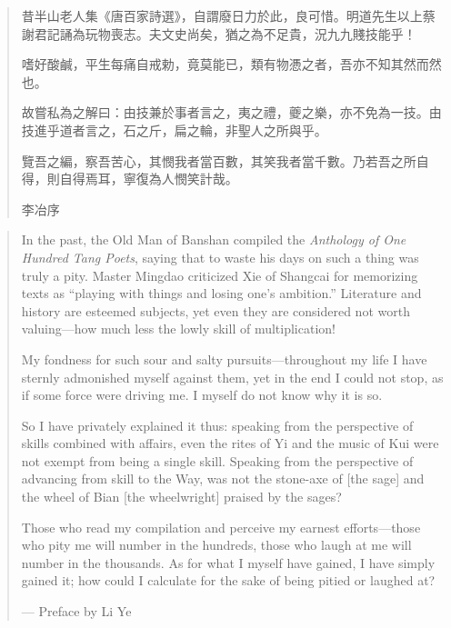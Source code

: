 \documentclass[11pt,a4paper]{article}
\newlength{\chwidth}
\newlength{\enwidth}
\newcommand{\zh}[1]{{\CJKfamily{sf}#1}}
\newenvironment{bilingual}{%
  \noindent
  \begin{minipage}[t]{\chwidth}%
  \small
}{%
  \end{minipage}%
}
\newcommand{\switchcolumn}{%
  \end{minipage}%
  \hfill%
  \begin{minipage}[t]{\enwidth}%
  \small
}
\begin{document}
\begin{bilingual}
\begin{quote}
\zh{昔半山老人集《唐百家詩選》，自謂廢日力於此，良可惜。明道先生以上蔡謝君記誦為玩物喪志。夫文史尚矣，猶之為不足貴，況九九賤技能乎！}

\vspace{0.3cm}
\zh{嗜好酸鹹，平生每痛自戒勅，竟莫能已，類有物慿之者，吾亦不知其然而然也。}

\vspace{0.3cm}
\zh{故嘗私為之解曰：由技兼於事者言之，夷之禮，夔之樂，亦不免為一技。由技進乎道者言之，石之斤，扁之輪，非聖人之所與乎。}

\vspace{0.3cm}
\zh{覽吾之編，察吾苦心，其憫我者當百數，其笑我者當千數。乃若吾之所自得，則自得焉耳，寧復為人憫笑計哉。}

\vspace{0.3cm}
\zh{\hfill 李冶序}
\end{quote}

\switchcolumn

\begin{quote}
In the past, the Old Man of Banshan compiled the \textit{Anthology of One Hundred Tang Poets}, saying that to waste his days on such a thing was truly a pity. Master Mingdao criticized Xie of Shangcai for memorizing texts as ``playing with things and losing one's ambition.'' Literature and history are esteemed subjects, yet even they are considered not worth valuing---how much less the lowly skill of multiplication!

\vspace{0.3cm}
My fondness for such sour and salty pursuits---throughout my life I have sternly admonished myself against them, yet in the end I could not stop, as if some force were driving me. I myself do not know why it is so.

\vspace{0.3cm}
So I have privately explained it thus: speaking from the perspective of skills combined with affairs, even the rites of Yi and the music of Kui were not exempt from being a single skill. Speaking from the perspective of advancing from skill to the Way, was not the stone-axe of [the sage] and the wheel of Bian [the wheelwright] praised by the sages?

\vspace{0.3cm}
Those who read my compilation and perceive my earnest efforts---those who pity me will number in the hundreds, those who laugh at me will number in the thousands. As for what I myself have gained, I have simply gained it; how could I calculate for the sake of being pitied or laughed at?

\vspace{0.3cm}
\hfill --- Preface by Li Ye
\end{quote}
\end{bilingual}
\end{document}
